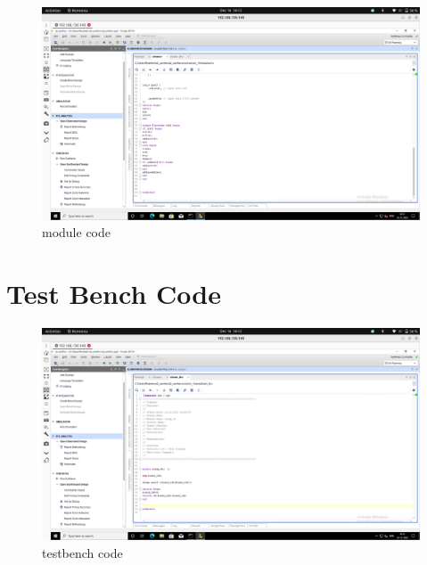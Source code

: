 \documentclass{article}
\begin{document}
\begin{figure}[h]
    \centering
\includegraphics[width=\columnwidth]{codes/module code/mc3.png}
    \caption{module code}
    \label{fig:my_label}
\end{figure}
\vspace{15cm}
\section{Test Bench Code}

\begin{figure}[h]
    \centering
\includegraphics[width=\columnwidth]{codes/testbench code/tb1.png}
    \caption{testbench code}
    \label{fig:my_label}
\end{figure}
\vspace{10cm}
\end{document}
